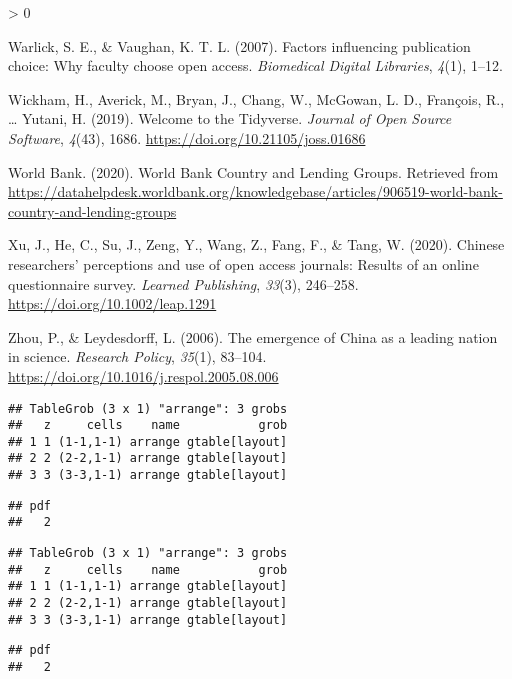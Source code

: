 \documentclass[
  english,
  man]{apa6}
\newlength{\cslhangindent}
\newenvironment{CSLReferences}[2] %
 {%
  \setlength{\parindent}{0pt}
  \ifodd #1 \everypar{\setlength{\hangindent}{\cslhangindent}}\ignorespaces\fi
  \ifnum #2 > 0
  \setlength{\parskip}{#2\baselineskip}
  \fi
 }%
 {}
\begin{document}
\begin{CSLReferences}{1}{0}
\leavevmode\hypertarget{ref-warlick_factors_2007}{}%
Warlick, S. E., \& Vaughan, K. T. L. (2007). Factors influencing publication choice: Why faculty choose open access. \emph{Biomedical Digital Libraries}, \emph{4}(1), 1--12.

\leavevmode\hypertarget{ref-wickham_welcome_2019}{}%
Wickham, H., Averick, M., Bryan, J., Chang, W., McGowan, L. D., François, R., \ldots{} Yutani, H. (2019). Welcome to the {Tidyverse}. \emph{Journal of Open Source Software}, \emph{4}(43), 1686. \url{https://doi.org/10.21105/joss.01686}

\leavevmode\hypertarget{ref-world_bank_world_2020}{}%
World Bank. (2020). World {Bank} {Country} and {Lending} {Groups}. Retrieved from \url{https://datahelpdesk.worldbank.org/knowledgebase/articles/906519-world-bank-country-and-lending-groups}

\leavevmode\hypertarget{ref-xu_chinese_2020}{}%
Xu, J., He, C., Su, J., Zeng, Y., Wang, Z., Fang, F., \& Tang, W. (2020). Chinese researchers' perceptions and use of open access journals: {Results} of an online questionnaire survey. \emph{Learned Publishing}, \emph{33}(3), 246--258. \url{https://doi.org/10.1002/leap.1291}

\leavevmode\hypertarget{ref-zhou_emergence_2006}{}%
Zhou, P., \& Leydesdorff, L. (2006). The emergence of {China} as a leading nation in science. \emph{Research Policy}, \emph{35}(1), 83--104. \url{https://doi.org/10.1016/j.respol.2005.08.006}

\end{CSLReferences}

\endgroup

\begin{verbatim}
## TableGrob (3 x 1) "arrange": 3 grobs
##   z     cells    name           grob
## 1 1 (1-1,1-1) arrange gtable[layout]
## 2 2 (2-2,1-1) arrange gtable[layout]
## 3 3 (3-3,1-1) arrange gtable[layout]
\end{verbatim}

\begin{verbatim}
## pdf 
##   2
\end{verbatim}

\begin{verbatim}
## TableGrob (3 x 1) "arrange": 3 grobs
##   z     cells    name           grob
## 1 1 (1-1,1-1) arrange gtable[layout]
## 2 2 (2-2,1-1) arrange gtable[layout]
## 3 3 (3-3,1-1) arrange gtable[layout]
\end{verbatim}

\begin{verbatim}
## pdf 
##   2
\end{verbatim}
\end{document}
